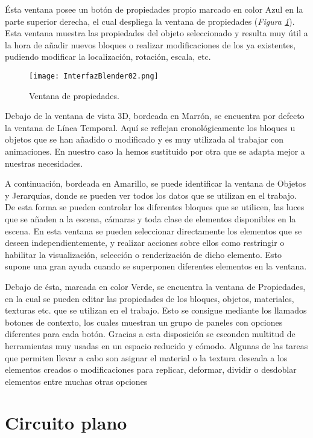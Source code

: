 Ésta ventana posee un botón de propiedades propio marcado en color Azul en la parte superior derecha, el cual despliega la ventana de propiedades (\textit{Figura \ref{fig:interfazblender02}}). Esta ventana muestra las propiedades del objeto seleccionado y resulta muy útil a la hora de añadir nuevos bloques o realizar modificaciones de los ya existentes, pudiendo modificar la localización, rotación, escala, etc.

\begin{figure}[h]
	\centering
	\texttt{[image: InterfazBlender02.png]}
	\caption{Ventana de propiedades.} \label{fig:interfazblender02}
\end{figure}

Debajo de la ventana de vista 3D, bordeada en Marrón, se encuentra por defecto la ventana de Línea Temporal. Aquí se reflejan cronológicamente los bloques u objetos que se han añadido o modificado y es muy utilizada al trabajar con animaciones. En nuestro caso la hemos sustituido por otra que se adapta mejor a nuestras necesidades.

A continuación, bordeada en Amarillo, se puede identificar la ventana de Objetos y Jerarquías, donde se pueden ver todos los datos que se utilizan en el trabajo. De esta forma se pueden controlar los diferentes bloques que se utilicen, las luces que se añaden a la escena, cámaras y toda clase de elementos disponibles en la escena. En esta ventana se pueden seleccionar directamente los elementos que se deseen independientemente, y realizar acciones sobre ellos como restringir o habilitar la visualización, selección o renderización de dicho elemento. Esto supone una gran ayuda cuando se superponen diferentes elementos en la ventana.

Debajo de ésta, marcada en color Verde, se encuentra la ventana de Propiedades, en la cual se pueden editar las propiedades de los bloques, objetos, materiales, texturas etc. que se utilizan en el trabajo. Esto se consigue mediante los llamados botones de contexto, los cuales muestran un grupo de paneles con opciones diferentes para cada botón. Gracias a esta disposición se esconden multitud de herramientas muy usadas en un espacio reducido y cómodo. Algunas de las tareas que permiten llevar a cabo son asignar el material o la textura deseada a los elementos creados o modificaciones para replicar, deformar, dividir o desdoblar elementos entre muchas otras opciones

\section{Circuito plano}
\label{sec:pm_circuitoplano}

